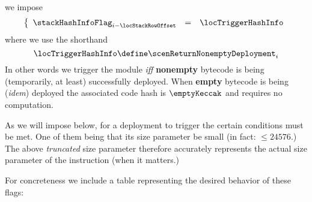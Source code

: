 \begin{description}
		we impose
		\[
			\left\{ \begin{array}{lcl}
				\stackHashInfoFlag_{i - \locStackRowOffset} & = & \locTriggerHashInfo                  \\
			\end{array} \right.
		\]
		where we use the shorthand
		\[
			\locTriggerHashInfo \define \scenReturnNonemptyDeployment_{i}
		\]
		\saNote{} In other words we trigger the \hashInfoMod{} module \emph{iff} \textbf{nonempty} bytecode is being (temporarily, at least) successfully deployed. When \textbf{empty} bytecode is being (\emph{idem}) deployed the associated code hash is $\emptyKeccak$ and requires no computation.

		\saNote{} As we will impose below, for a deployment to trigger the \hashInfoMod{} certain conditions must be met. One of them being that its size parameter be small (in fact: $\leq 24576$.) The above \emph{truncated} size parameter therefore accurately represents the actual size parameter of the instruction (when it matters.)
\end{description}
For concreteness we include a table representing the desired behavior of these flags:
